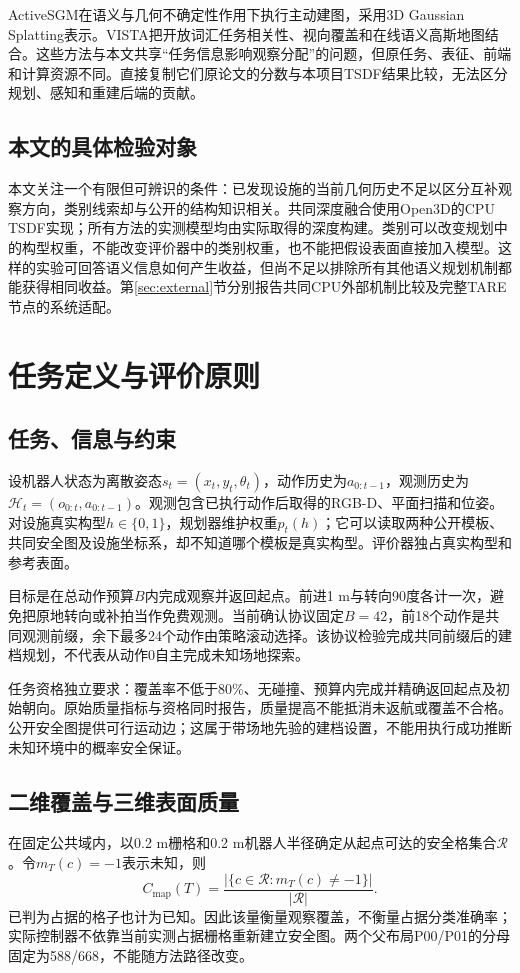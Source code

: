 \documentclass[11pt,a4paper]{article}
\newcommand{\C}{C_{\mathrm{map}}}
\begin{document}
ActiveSGM在语义与几何不确定性作用下执行主动建图，采用3D Gaussian Splatting表示\cite{chen2025activesgm}。VISTA把开放词汇任务相关性、视向覆盖和在线语义高斯地图结合\cite{nagami2026vista}。这些方法与本文共享“任务信息影响观察分配”的问题，但原任务、表征、前端和计算资源不同。直接复制它们原论文的分数与本项目TSDF结果比较，无法区分规划、感知和重建后端的贡献。

\subsection{本文的具体检验对象}
本文关注一个有限但可辨识的条件：已发现设施的当前几何历史不足以区分互补观察方向，类别线索却与公开的结构知识相关。共同深度融合使用Open3D的CPU TSDF实现\cite{zhou2018open3d}；所有方法的实测模型均由实际取得的深度构建。类别可以改变规划中的构型权重，不能改变评价器中的类别权重，也不能把假设表面直接加入模型。这样的实验可回答语义信息如何产生收益，但尚不足以排除所有其他语义规划机制都能获得相同收益。第\ref{sec:external}节分别报告共同CPU外部机制比较及完整TARE节点的系统适配。

\section{任务定义与评价原则}
\subsection{任务、信息与约束}
设机器人状态为离散姿态$s_t=(x_t,y_t,\theta_t)$，动作历史为$a_{0:t-1}$，观测历史为$\mathcal H_t=(o_{0:t},a_{0:t-1})$。观测包含已执行动作后取得的RGB-D、平面扫描和位姿。对设施真实构型$h\in\{0,1\}$，规划器维护权重$p_t(h)$；它可以读取两种公开模板、共同安全图及设施坐标系，却不知道哪个模板是真实构型。评价器独占真实构型和参考表面。

目标是在总动作预算$B$内完成观察并返回起点。前进1 m与转向90度各计一次，避免把原地转向或补拍当作免费观测。当前确认协议固定$B=42$，前18个动作是共同观测前缀，余下最多24个动作由策略滚动选择。该协议检验完成共同前缀后的建档规划，不代表从动作0自主完成未知场地探索。

任务资格独立要求：覆盖率不低于80\%、无碰撞、预算内完成并精确返回起点及初始朝向。原始质量指标与资格同时报告，质量提高不能抵消未返航或覆盖不合格。公开安全图提供可行运动边；这属于带场地先验的建档设置，不能用执行成功推断未知环境中的概率安全保证。

\subsection{二维覆盖与三维表面质量}
在固定公共域内，以0.2 m栅格和0.2 m机器人半径确定从起点可达的安全格集合$\mathcal R$。令$m_T(c)=-1$表示未知，则
\begin{equation}
\C(T)=\frac{\left|\{c\in\mathcal R:m_T(c)\ne-1\}\right|}{|\mathcal R|}.
\label{eq:coverage}
\end{equation}
已判为占据的格子也计为已知。因此该量衡量观察覆盖，不衡量占据分类准确率；实际控制器不依靠当前实测占据栅格重新建立安全图。两个父布局P00/P01的分母固定为588/668，不能随方法路径改变。
\end{document}
